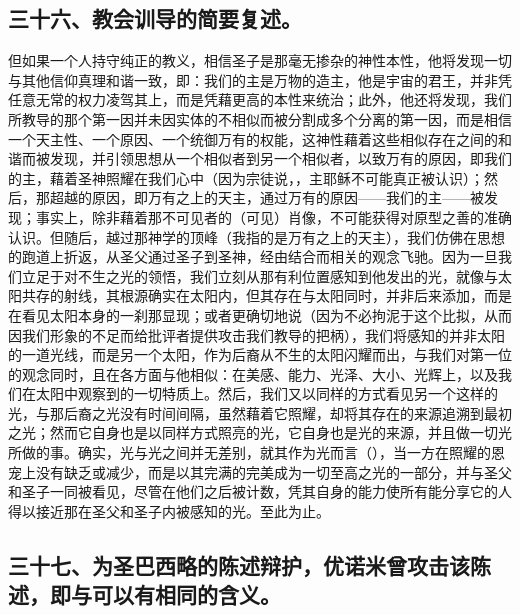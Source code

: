 
\subsection{三十六、教会训导的简要复述。}

但如果一个人持守纯正的教义，相信圣子是那毫无掺杂的神性本性，他将发现一切与其他信仰真理和谐一致，即：我们的主是万物的造主，他是宇宙的君王，并非凭任意无常的权力凌驾其上，而是凭藉更高的本性来统治；此外，他还将发现，我们所教导的那个第一因并未因实体的不相似而被分割成多个分离的第一因，而是相信一个天主性、一个原因、一个统御万有的权能，这神性藉着这些相似存在之间的和谐而被发现，并引领思想从一个相似者到另一个相似者，以致万有的原因，即我们的主，藉着圣神照耀在我们心中（因为宗徒说，，主耶稣不可能真正被认识）；然后，那超越的原因，即万有之上的天主，通过万有的原因——我们的主——被发现；事实上，除非藉着那不可见者的（可见）肖像，不可能获得对原型之善的准确认识。但随后，越过那神学的顶峰（我指的是万有之上的天主），我们仿佛在思想的跑道上折返，从圣父通过圣子到圣神，经由结合而相关的观念飞驰。因为一旦我们立足于对不生之光的领悟，我们立刻从那有利位置感知到他发出的光，就像与太阳共存的射线，其根源确实在太阳内，但其存在与太阳同时，并非后来添加，而是在看见太阳本身的一刹那显现；或者更确切地说（因为不必拘泥于这个比拟，从而因我们形象的不足而给批评者提供攻击我们教导的把柄），我们将感知的并非太阳的一道光线，而是另一个太阳，作为后裔从不生的太阳闪耀而出，与我们对第一位的观念同时，且在各方面与他相似：在美感、能力、光泽、大小、光辉上，以及我们在太阳中观察到的一切特质上。然后，我们又以同样的方式看见另一个这样的光，与那后裔之光没有时间间隔，虽然藉着它照耀，却将其存在的来源追溯到最初之光；然而它自身也是以同样方式照亮的光，它自身也是光的来源，并且做一切光所做的事。确实，光与光之间并无差别，就其作为光而言（），当一方在照耀的恩宠上没有缺乏或减少，而是以其完满的完美成为一切至高之光的一部分，并与圣父和圣子一同被看见，尽管在他们之后被计数，凭其自身的能力使所有能分享它的人得以接近那在圣父和圣子内被感知的光。至此为止。\par


\subsection{三十七、为圣巴西略的陈述辩护，优诺米曾攻击该陈述，即与可以有相同的含义。}

